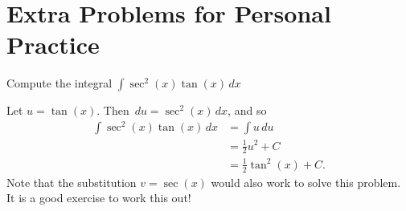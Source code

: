 \documentclass[handout, nooutcomes]{ximera}
\renewenvironment{freeResponse}{
\ifhandout\setbox0\vbox\bgroup\else
\begin{trivlist}\item[\hskip \labelsep\bfseries Solution:\hspace{2ex}]
\fi}
{\ifhandout\egroup\else
\end{trivlist}
\fi}
\renewcommand{\d}{\,d}
\begin{document}
\section{Extra Problems for Personal Practice}
\begin{problem}
Compute the integral $\int \sec^2(x) \tan(x) \d x$
	\begin{freeResponse}
		Let $u = \tan(x)$.  Then $\d u = \sec^2 (x) \d x$, and so
		\begin{align*}
			\int \sec^2(x) \tan(x) \d x &= \int u \d u  \\
			&= \frac{1}{2} u^2 + C  \\
			&= \frac{1}{2} \tan^2(x) + C.
		\end{align*}
	   Note that the substitution $v=\sec(x)$ would also work to solve this problem.
		It is a good exercise to work this out!
	\end{freeResponse}
\end{problem}
\end{document}
